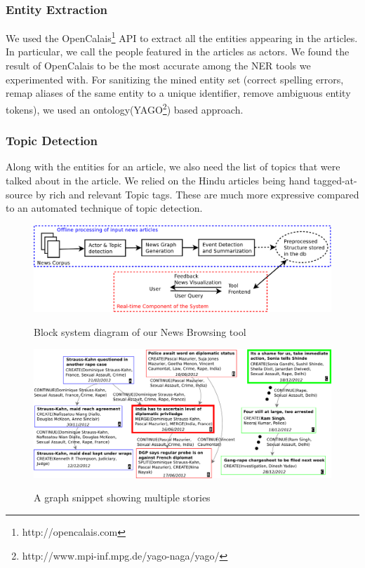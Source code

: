 \subsubsection*{Entity Extraction}
We used the OpenCalais\footnote{http://opencalais.com} API to extract all the entities appearing in the articles. In particular, we call
the people featured in the articles as actors. We found the result of OpenCalais to be the most accurate among the NER tools we experimented with.
For sanitizing the mined entity set (correct spelling errors, remap aliases of the same entity to a unique identifier, remove ambiguous entity tokens),
we used an ontology(YAGO\footnote{http://www.mpi-inf.mpg.de/yago-naga/yago/}) based approach.
\subsubsection*{Topic Detection}
Along with the entities for an article, we also need the list of topics that were talked about in the article. 
We relied on the Hindu articles being hand tagged-at-source by rich and relevant Topic tags. These are much more expressive compared to an automated technique of topic detection.
\begin{figure}
\caption{Block system diagram of our News Browsing tool}
\includegraphics[scale=0.24]{figures/system-design.pdf}
\label{fig:block-system-design}
\end{figure}
\begin{figure}
\caption{A graph snippet showing multiple stories}
\includegraphics[scale=0.34]{figures/graph-2.pdf}
\label{fig:context-graph-example}
\end{figure}

